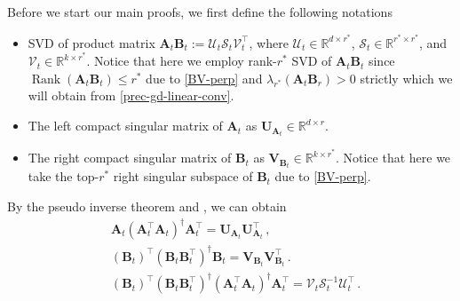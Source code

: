 Before we start our main proofs, we first define the following notations
\begin{itemize}
    \item SVD of product matrix $\bm A_t \bm B_t := \mathcal{U}_t \mathcal{S}_t \mathcal{V}_t^{\!\top}$, where $\mathcal{U}_t \in \mathbb{R}^{d\times r^*}$, $\mathcal{S}_t \in \mathbb{R}^{r^*\times r^*}$, and $\mathcal{V}_t\in \mathbb{R}^{k\times r^*}$. Notice that here we employ rank-$r^*$ SVD of $\bm A_t \bm B_t$ since $\operatorname{Rank}\left(\bm A_t\bm B_t\right)\leq r^*$ due to \cref{BV-perp} and $\lambda_{r^*}\left(\bm A_t \bm B_r\right)>0$ strictly which we will obtain from \cref{prec-gd-linear-conv}.
    \item The left compact singular matrix of $\bm A_t$ as $\bm U_{\bm A_t} \in \mathbb{R}^{d\times r}$.
    \item The right compact singular matrix of $\bm B_t$ as $\bm V_{\bm B_t} \in \mathbb{R}^{k\times r^*}$. Notice that here we take the top-$r^*$ right singular subspace of $\bm B_t$ due to \cref{BV-perp}.
\end{itemize}
By the pseudo inverse theorem and \citet[Lemma 14]{jia2024preconditioning}, we can obtain
\begin{align}
    &\bm A_t \left(\bm A_t^{\!\top} \bm A_t\right)^\dagger\bm A_t^{\!\top} = \bm U_{\bm A_t} \bm U_{\bm A_t}^{\!\top}\,,\label{proj-A}\\ 
    &\left(\bm B_t\right)^{\!\top}\left(\bm B_t \bm B_t^{\!\top}\right)^\dagger\bm B_t = \bm V_{\bm B_t}\bm V_{\bm B_t}^{\!\top}\,.\label{proj-B}\\
    &\left(\bm B_t\right)^{\!\top}\left(\bm B_t \bm B_t^{\!\top}\right)^\dagger\left(\bm A_t^{\!\top} \bm A_t\right)^\dagger\bm A_t^{\!\top} = \mathcal{V}_t \mathcal{S}^{-1}_t \mathcal{U}_t^{\!\top}\label{pseudo-inverse-AB}\,.
\end{align}

